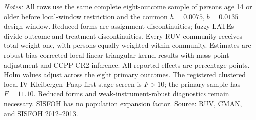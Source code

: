 \parbox{0.97\linewidth}{\footnotesize \textit{Notes:} All rows use the same complete eight-outcome sample of persons age 14 or older before local-window restriction and the common \(h=0.0075\), \(b=0.0135\) design window. Reduced forms are assignment discontinuities; fuzzy LATEs divide outcome and treatment discontinuities. Every RUV community receives total weight one, with persons equally weighted within community. Estimates are robust bias-corrected local-linear triangular-kernel results with mass-point adjustment and CCPP CR2 inference. All reported effects are percentage points. Holm values adjust across the eight primary outcomes. The registered clustered local-IV Kleibergen--Paap first-stage screen is \(F>10\); the primary sample has \(F=11.10\). Reduced forms and weak-instrument-robust diagnostics remain necessary. SISFOH has no population expansion factor. Source: RUV, CMAN, and SISFOH 2012--2013.}
\par{}\par\endgroup
